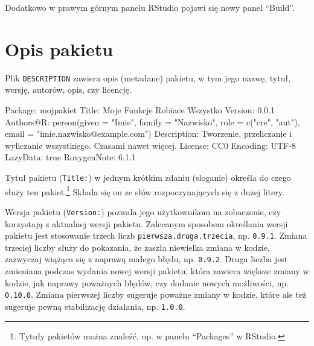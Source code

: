 \documentclass[paper=6in:9in,pagesize=pdftex,headinclude=on,footinclude=on,10pt]{scrbook}
\newenvironment{Shaded}{\begin{snugshade}}{\end{snugshade}}
\newcommand{\AttributeTok}[1]{\textcolor[rgb]{0.77,0.63,0.00}{#1}}
\newcommand{\FunctionTok}[1]{\textcolor[rgb]{0.00,0.00,0.00}{#1}}
\newcommand{\NormalTok}[1]{#1}
\newcommand{\StringTok}[1]{\textcolor[rgb]{0.31,0.60,0.02}{#1}}
\begin{document}
Dodatkowo w prawym górnym panelu RStudio pojawi się nowy panel ``Build''.

\hypertarget{opis-pakietu}{%
\section{Opis pakietu}\label{opis-pakietu}}

Plik \texttt{DESCRIPTION} zawiera opis (metadane) pakietu, w tym jego nazwę, tytuł, wersję, autorów, opis, czy licencję.

\begin{Shaded}
\begin{Highlighting}[]
\FunctionTok{Package:}\AttributeTok{ mojpakiet}
\FunctionTok{Title:}\AttributeTok{ Moje Funkcje Robiace Wszystko}
\FunctionTok{Version:}\AttributeTok{ 0.0.1}
\FunctionTok{Authors@R:}\AttributeTok{ }
\NormalTok{    person(given = }\StringTok{"Imie"}\NormalTok{,}
\NormalTok{           family = }\StringTok{"Nazwisko"}\NormalTok{,}
\NormalTok{           role = c(}\StringTok{"cre"}\NormalTok{, }\StringTok{"aut"}\NormalTok{),}
\NormalTok{           email = }\StringTok{"imie.nazwisko@example.com"}\NormalTok{)}
\FunctionTok{Description:}\AttributeTok{ Tworzenie, przeliczanie i wyliczanie wszystkiego. }
\NormalTok{    Czasami nawet więcej.}
\FunctionTok{License:}\AttributeTok{ CC0}
\FunctionTok{Encoding:}\AttributeTok{ UTF-8}
\FunctionTok{LazyData:}\AttributeTok{ true}
\FunctionTok{RoxygenNote:}\AttributeTok{ 6.1.1}
\end{Highlighting}
\end{Shaded}

Tytuł pakietu (\texttt{Title:}) w jednym krótkim zdaniu (sloganie) określa do czego służy ten pakiet.\footnote{Tytuły pakietów można znaleźć, np. w panelu ``Packages'' w RStudio.}
Składa się on ze słów rozpoczynających się z dużej litery.

Wersja pakietu (\texttt{Version:}) pozwala jego użytkownikom na zobaczenie, czy korzystają z aktualnej wersji pakietu.
Zalecanym sposobem określania wersji pakietu jest stosowanie trzech liczb \texttt{pierwsza.druga.trzecia}, np. \texttt{0.9.1}.
Zmiana trzeciej liczby służy do pokazania, że zaszła niewielka zmiana w kodzie, zazwyczaj wiążąca się z naprawą małego błędu, np. \texttt{0.9.2}.
Druga liczba jest zmieniana podczas wydania nowej wersji pakietu, która zawiera większe zmiany w kodzie, jak naprawy poważnych błędów, czy dodanie nowych możliwości, np. \texttt{0.10.0}.
Zmiana pierwszej liczby sugeruje poważne zmiany w kodzie, które ale też sugeruje pewną stabilizację działania, np. \texttt{1.0.0}.
\end{document}
